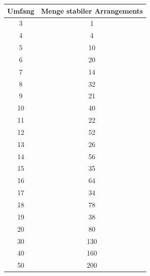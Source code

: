 \documentclass[a4paper,10pt,ngerman,captions=figureheading]{scrartcl}
\begin{document}
\begin{table}[ht]
    \begin{center}
        \begin{tabularx}{\linewidth}{c|c}
            \textbf{Umfang} & \textbf{Menge stabiler Arrangements} \\
            \midrule
            3               & 1                                    \\
            4               & 4                                    \\
            5               & 10                                   \\
            6               & 20                                   \\
            7               & 14                                   \\
            8               & 32                                   \\
            9               & 21                                   \\
            10              & 40                                   \\
            11              & 22                                   \\
            12              & 52                                   \\
            13              & 26                                   \\
            14              & 56                                   \\
            15              & 35                                   \\
            16              & 64                                   \\
            17              & 34                                   \\
            18              & 78                                   \\
            19              & 38                                   \\
            20              & 80                                   \\
            30              & 130                                  \\
            40              & 160                                  \\
            50              & 200                                  \\

\end{tabularx}
\end{center}
\end{table}
\end{document}
